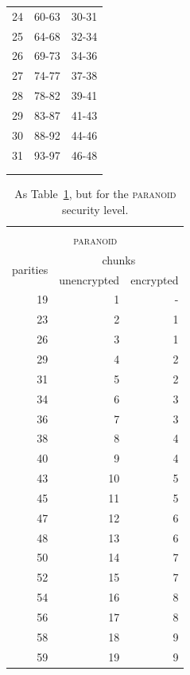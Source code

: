 \documentclass[manuscript,screen,review]{acmart}
\begin{document}
\begin{table}[!ht]
\begin{minipage}{.49\linewidth}
\begin{tabular}{|r|r|r|}
24 & 60-63 & 30-31\\
25 & 64-68 & 32-34\\
26 & 69-73 & 34-36\\
27 & 74-77 & 37-38\\
28 & 78-82 & 39-41\\
29 & 83-87 & 41-43\\
30 & 88-92 & 44-46\\
31 & 93-97 & 46-48\\
\hline
\multicolumn{3}{c}{}\\
\multicolumn{3}{c}{}
\end{tabular}
\end{minipage}
\label{tbl:parities}
\end{table}


\begin{table}[!ht]
\caption{As Table~\ref{tbl:parities}, but for the \textsc{paranoid} security level.}
\begin{minipage}{.49\linewidth}
\centering
\begin{tabular}{|r|r|r|}
\multicolumn{3}{c}{\textsc{}}\\
\multicolumn{3}{c}{\textsc{paranoid}}\\\hline
\multirow{2}{1.5cm}{\centering 
 parities } 
&\multicolumn{2}{|c|}{ chunks }\\\cline{2-3}
&\multicolumn{1}{|c|}{unencrypted} 
&\multicolumn{1}{|c|}{encrypted} \\\hline\hline
19 & 1 & -\\
23 & 2  & 1\\
26 & 3  & 1\\
29 & 4  & 2\\
31 & 5  & 2\\
34 & 6  & 3\\
36 & 7  & 3\\
38 & 8  & 4\\
40 & 9  & 4\\
43 & 10 & 5\\
45 & 11 & 5\\
47 & 12 & 6\\
48 & 13 & 6\\
50 & 14 & 7\\
52 & 15 & 7\\
54 & 16 & 8\\
56 & 17 & 8\\
58 & 18 & 9\\
59 & 19 & 9\\
\hline
\end{tabular}
\end{minipage}

\end{table}
\end{document}

